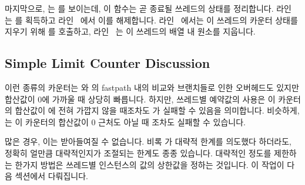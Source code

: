 \begin{fcvref}
마지막으로,  는  를 보이는데,
이 함수는 곧 종료될 쓰레드의 상태를 정리합니다.
라인~ 는  를 획득하고 라인~ 에서
이를 해제합니다.
라인~ 에서는 이 쓰레드의 카운터 상태를 지우기 위해
 를 호출하고, 라인~ 는 이 쓰레드의
 배열 내 원소를 지웁니다.
\end{fcvref}

\subsection{Simple Limit Counter Discussion}
\label{sec:count:Simple Limit Counter Discussion}

이런 종류의 카운터는  와  의 fastpath 내의
비교와 브랜치들로 인한 오버헤드도 있지만 합산값이 0에 가까울 때 상당히
빠릅니다.
하지만, 쓰레드별  예약값의 사용은 이 카운터의 합산값이
 에 전혀 가깝지 않을 때조차도  가 실패할 수
있음을 의미합니다.
비슷하게,  는 이 카운터의 합산값이 0 근처도 아닐 때 조차도
실패할 수 있습니다.

많은 경우, 이는 받아들여질 수 없습니다.
비록  가 대략적 한계를 의도했다 하더라도, 정확히 얼만큼
대략적인지가 조절되는 한계도 종종 있습니다.
대략적인 정도를 제한하는 한가지 방법은 쓰레드별  인스턴스의 값의
상한값을 정하는 것입니다.
이 작업이 다음 섹션에서 다뤄집니다.


